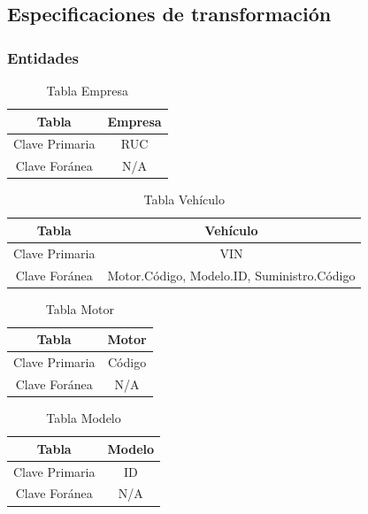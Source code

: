 \documentclass[12pt]{article}
\begin{document}
\newpage

\subsection{Especificaciones de transformaci\'on}

\subsubsection{Entidades}


\begin{table}[htbp]
\begin{center}
\begin{tabular}{|c|c|}
\hline
Tabla & Empresa \\
\hline
Clave Primaria & RUC \\
\hline
Clave Foránea & N/A \\
\hline
\end{tabular}
\caption{Tabla Empresa}
\end{center}
\end{table}


\begin{table}[htbp]
\begin{center}
\begin{tabular}{|c|c|}
\hline
Tabla & Vehículo \\
\hline
Clave Primaria & VIN \\
\hline
Clave Foránea & Motor.Código, Modelo.ID, Suministro.Código \\
\hline
\end{tabular}
\caption{Tabla Vehículo}
\end{center}
\end{table}


\begin{table}[htbp]
\begin{center}
\begin{tabular}{|c|c|}
\hline
Tabla & Motor \\
\hline
Clave Primaria & Código \\
\hline
Clave Foránea & N/A \\
\hline
\end{tabular}
\caption{Tabla Motor}
\end{center}
\end{table}


\begin{table}[htbp]
\begin{center}
\begin{tabular}{|c|c|}
\hline
Tabla & Modelo \\
\hline
Clave Primaria & ID \\
\hline
Clave Foránea & N/A \\
\hline
\end{tabular}
\caption{Tabla Modelo}
\end{center}
\end{table}
\end{document}
